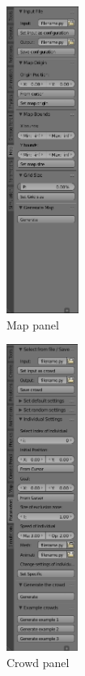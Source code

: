 \begin{figure}[h] \centering
  \begin{subfigure}[t]{0.2\textwidth}
    \includegraphics[height=10cm]{img/GUI_map_example.png}
    \caption{Map panel}
  \end{subfigure} %
  \begin{subfigure}[t]{0.2\textwidth}
    \includegraphics[height=10cm]{img/GUI_crowd_example.png}
    \caption{Crowd panel}
  \end{subfigure} %
  \begin{subfigure}[t]{0.5\textwidth}

\end{subfigure}
\end{figure}

